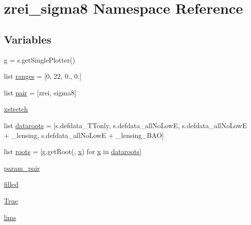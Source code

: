 \hypertarget{namespacezrei__sigma8}{}\section{zrei\+\_\+sigma8 Namespace Reference}
\label{namespacezrei__sigma8}
\subsection*{Variables}
\begin{DoxyCompactItemize}
\item 
\mbox{\hyperlink{namespacezrei__sigma8_af7715b08294bcf837766f3f0edf6c769}{g}} = s.\+get\+Single\+Plotter()
\item 
list \mbox{\hyperlink{namespacezrei__sigma8_aefa400841b022f7cc060f04636809e52}{ranges}} = \mbox{[}0, 22, 0., 0.\mbox{]}
\item 
list \mbox{\hyperlink{namespacezrei__sigma8_a4e39664934842c272c0ee477095185ea}{pair}} = \mbox{[}\textquotesingle{}zrei\textquotesingle{}, \textquotesingle{}sigma8\textquotesingle{}\mbox{]}
\item 
\mbox{\hyperlink{namespacezrei__sigma8_a336f733c513429028b0e1e32cfaf6e1f}{xstretch}}
\item 
list \mbox{\hyperlink{namespacezrei__sigma8_a118212376f3e455452cb4bab6080dae4}{dataroots}} = \mbox{[}s.\+defdata\+\_\+\+T\+Tonly, s.\+defdata\+\_\+all\+No\+LowE, s.\+defdata\+\_\+all\+No\+LowE + \textquotesingle{}\+\_\+lensing\textquotesingle{}, s.\+defdata\+\_\+all\+No\+LowE + \textquotesingle{}\+\_\+lensing\+\_\+\+B\+AO\textquotesingle{}\mbox{]}
\item 
list \mbox{\hyperlink{namespacezrei__sigma8_a328c27f8e3e608e39006afa35b2b5046}{roots}} = \mbox{[}g.\+get\+Root(\textquotesingle{}\textquotesingle{}, \mbox{\hyperlink{plotTT_8m_a9336ebf25087d91c818ee6e9ec29f8c1}{x}}) for \mbox{\hyperlink{plotTT_8m_a9336ebf25087d91c818ee6e9ec29f8c1}{x}} in \mbox{\hyperlink{namespacezrei__sigma8_a118212376f3e455452cb4bab6080dae4}{dataroots}}\mbox{]}
\item 
\mbox{\hyperlink{namespacezrei__sigma8_a4fc6628f795744bd3cb83991c03f2ddc}{param\+\_\+pair}}
\item 
\mbox{\hyperlink{namespacezrei__sigma8_ab10a32fafcff2a9c478232bcb38df5ab}{filled}}
\item 
\mbox{\hyperlink{namespacezrei__sigma8_a4c2f725938ef77284a793493498ea6ab}{True}}
\item 
\mbox{\hyperlink{namespacezrei__sigma8_a91cbc08a5f6e93d7641bdd1d90eb2da2}{lims}}

\end{DoxyCompactItemize}
